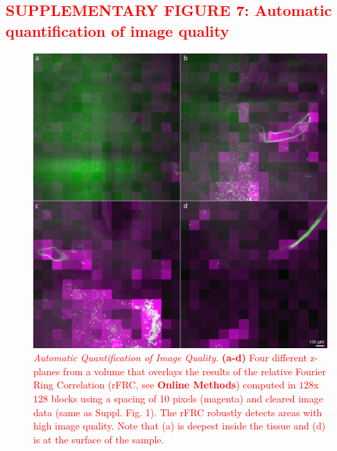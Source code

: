 \documentclass[]{spie}  %
\def\red{\textcolor{red}}
\begin{document}
\subsection*{\red{SUPPLEMENTARY FIGURE 7: Automatic quantification of image quality}}
\vspace{1mm}
\begin{figure}[h!]
\includegraphics[width=\textwidth]{rFRC.jpg}
\vspace{-2.0mm}
\caption{\hspace{-0.5mm} \red{\emph{Automatic Quantification of Image Quality.} \textbf{(a-d)} Four different z-planes from a volume that overlays the results of the relative Fourier Ring Correlation (rFRC, see \textbf{Online Methods}) computed in $128$x$128$ blocks using a spacing of 10 pixels (magenta) and cleared image data (same as Suppl. Fig. 1). The rFRC robustly detects areas with high image quality. Note that (a) is deepest inside the tissue and (d) is at the surface of the sample.
}}
\label{fig:sup-rFRC}
\end{figure}

\pagebreak
\end{document}

